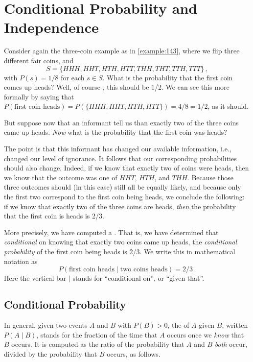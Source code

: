 \section{Conditional Probability and Independence}\label{cond_prob_indp}
Consider again the three-coin example as in \autoref{example:143}, where we flip three different fair coins, and
$$
S=\{HHH, HHT, HTH, HTT, THH, THT, TTH, TTT\}\,,
$$
with $P(s)=1/8$ for each $s \in S$. What is the probability that the first coin comes up heads? Well, of  course , this should be 1/2. We can see this more formally by saying that $P(\text{first coin heads})=P(\{HHH, HHT, HTH, HTT\})=4/8=1/2$, as it should.

But suppose  now that an informant tell us than exactly two of the three coins came up heads. \emph{Now} what is the probability that the first coin was heads?

The point is that this informant has changed our available information, i.e., changed our level of ignorance. It follows that our corresponding probabilities should also change. Indeed, if we know that exactly two of coins were heads, then we know that the outcome was one of $HHT$, $HTH$, and $THH$. Because those three outcomes should (in this case) still all be equally likely, and because only the first two correspond to the first coin being heads, we conclude the following: if we know that exactly two of the three coins are heads, \emph{then} the probability that the first coin is heads is 2/3.

More precisely, we have computed a . That is, we have determined that \emph{conditional} on knowing that exactly two coins came up heads, the \emph{conditional probability} of the first coin being heads is 2/3. We write this in mathematical notation as
$$
P(\text{first coin heads} \mid \text{two coins heads}) = 2/3\,.
$$
Here the vertical bar $\mid$ stands for ``conditional on'', or ``given that''.

\subsection{Conditional Probability}
In general, given two events $A$ and $B$ with $P(B)>0$, the  of $A$ given $B$, written $P(A\mid B)$, stands for the fraction of the time that $A$ occurs once we \emph{know} that $B$ occurs. It is computed as the ratio of the probability that $A$ and $B$ \emph{both} occur, divided by the probability that $B$ occurs, as follows.

